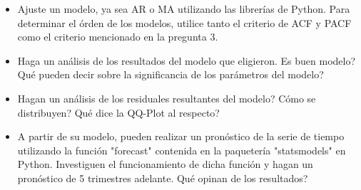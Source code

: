 \documentclass[10pt,a4paper]{article}
\begin{document}
\begin{enumerate}
\begin{itemize}
            \item Ajuste un modelo, ya sea AR o MA utilizando las librerías de Python. Para determinar el órden de los modelos, utilice tanto el criterio de ACF y PACF como el criterio mencionado en la pregunta 3.
            \item Haga un análisis de los resultados del modelo que eligieron. Es buen modelo? Qué pueden decir sobre la significancia de los parámetros del modelo?
            \item Hagan un análisis de los residuales resultantes del modelo? Cómo se distribuyen? Qué dice la QQ-Plot al respecto?
            \item A partir de su modelo, pueden realizar un pronóstico de la serie de tiempo utilizando la función "forecast" contenida en la paquetería "statsmodels" en Python. Investiguen el funcionamiento de dicha función y hagan un pronóstico de 5 trimestres adelante. Qué opinan de los resultados?
        \end{itemize}
\end{enumerate}
\end{document}
